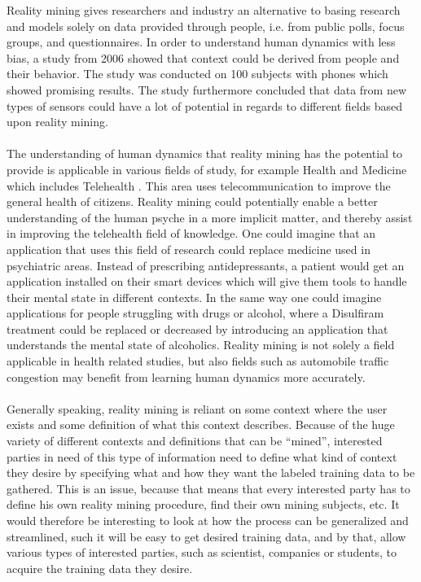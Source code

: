 Reality mining gives researchers and industry an alternative to basing research and models solely on data provided through people, i.e. from public polls, focus groups, and questionnaires. In order to understand human dynamics with less bias, a study from 2006 \parencite{eagle2006_reality_mining_definition} showed that context could be derived from people and their behavior. The study was conducted on 100 subjects with phones which showed promising results. The study furthermore concluded that data from new types of sensors could have a lot of potential in regards to different fields based upon reality mining. 
\\\\
The understanding of human dynamics that reality mining has the potential to provide is applicable in various fields of study, for example Health and Medicine \parencite{pentland2009_reality_mining_health_medicine} which includes Telehealth \parencite{telehealth_aau}. This area uses telecommunication to improve the general health of citizens. Reality mining could potentially enable a better understanding of the human psyche in a more implicit matter, and thereby assist in improving the telehealth field of knowledge. One could imagine that an application that uses this field of research could replace medicine used in psychiatric areas. Instead of prescribing antidepressants, a patient would get an application installed on their smart devices which will give them tools to handle their mental state in different contexts. In the same way one could imagine applications for people struggling with drugs or alcohol, where a Disulfiram \parencite{nlm_disulfiram} treatment could be replaced or decreased by introducing an application that understands the mental state of alcoholics. Reality mining is not solely a field applicable in health related studies, but also fields such as automobile traffic congestion \parencite{pentland2009reality_mining_mobile_communication_gps} may benefit from learning human dynamics more accurately.
\\\\
Generally speaking, reality mining is reliant on some context where the user exists and some definition of what this context describes. Because of the huge variety of different contexts and definitions that can be ``mined'', interested parties in need of this type of information need to define what kind of context they desire by specifying what and how they want the labeled training data to be gathered. This is an issue, because that means that every interested party has to define his own reality mining procedure, find their own mining subjects, etc. It would therefore be interesting to look at how the process can be generalized and streamlined, such it will be easy to get desired training data, and by that, allow various types of interested parties, such as scientist, companies or students, to acquire the training data they desire.
